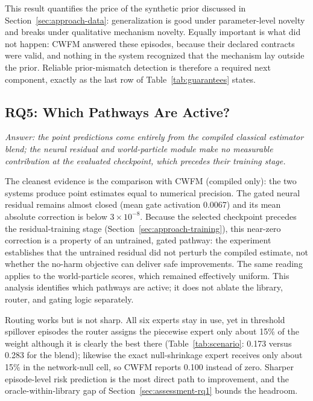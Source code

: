 \documentclass[electronics,article,submit,oneauthor]{Definitions/mdpi}
\begin{document}
This result quantifies the price of the synthetic prior discussed in Section~\ref{sec:approach-data}: generalization is good under parameter-level novelty and breaks under qualitative mechanism novelty. Equally important is what did not happen: CWFM answered these episodes, because their declared contracts were valid, and nothing in the system recognized that the mechanism lay outside the prior. Reliable prior-mismatch detection is therefore a required next component, exactly as the last row of Table~\ref{tab:guarantees} states.

\subsection{RQ5: Which Pathways Are Active?}\label{sec:assessment-rq5}

\emph{Answer: the point predictions come entirely from the compiled classical estimator blend; the neural residual and world-particle module make no measurable contribution at the evaluated checkpoint, which precedes their training stage.}

The cleanest evidence is the comparison with CWFM (compiled only): the two systems produce point estimates equal to numerical precision. The gated neural residual remains almost closed (mean gate activation 0.0067) and its mean absolute correction is below $3\times10^{-8}$. Because the selected checkpoint precedes the residual-training stage (Section~\ref{sec:approach-training}), this near-zero correction is a property of an untrained, gated pathway: the experiment establishes that the untrained residual did not perturb the compiled estimate, not whether the no-harm objective can deliver safe improvements. The same reading applies to the world-particle scores, which remained effectively uniform. This analysis identifies which pathways are active; it does not ablate the library, router, and gating logic separately.

Routing works but is not sharp. All six experts stay in use, yet in threshold spillover episodes the router assigns the piecewise expert only about 15\% of the weight although it is clearly the best there (Table~\ref{tab:scenario}: 0.173 versus 0.283 for the blend); likewise the exact null-shrinkage expert receives only about 15\% in the network-null cell, so CWFM reports 0.100 instead of zero. Sharper episode-level risk prediction is the most direct path to improvement, and the oracle-within-library gap of Section~\ref{sec:assessment-rq1} bounds the headroom.
\end{document}
